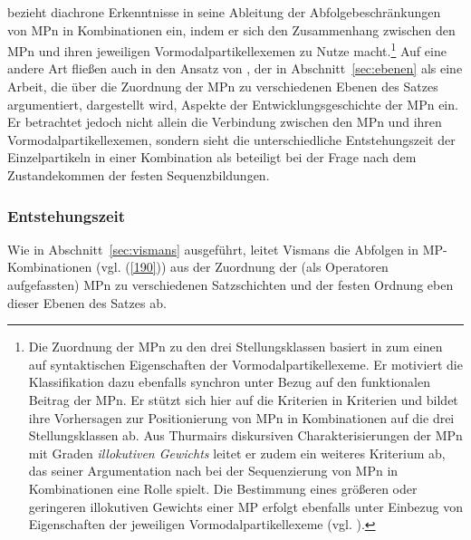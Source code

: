 \noindent
\citet{Abraham1995} bezieht diachrone  Erkenntnisse in seine Ableitung der Abfolgebeschränkungen von MPn in Kombinationen ein, indem er sich den Zusammenhang zwischen den MPn und ihren jeweiligen Vormodalpartikellexemen  zu Nutze macht.\footnote{Die Zuordnung der MPn zu den drei Stellungsklassen basiert in \citet{Abraham1995} zum einen auf syntaktischen Eigenschaften der Vormodalpartikellexeme. Er motiviert die Klassifikation dazu ebenfalls synchron unter Bezug auf den funktionalen Beitrag der MPn. Er stützt sich hier auf die Kriterien in \citet{Thurmair1989, Thurmair1991} Kriterien und bildet ihre Vorhersagen zur Positionierung von MPn in Kombinationen auf die drei Stellungsklassen ab. Aus Thurmairs diskursiven Charakterisierungen der MPn mit Graden \textit{illokutiven Gewichts} leitet er zudem ein weiteres Kriterium ab, das seiner Argumentation nach bei der Sequenzierung von MPn in Kombinationen eine Rolle spielt. Die Bestimmung eines größeren oder geringeren illokutiven Gewichts einer MP erfolgt ebenfalls unter Einbezug von Eigenschaften der jeweiligen Vormodalpartikellexeme  (vgl. \citealt[104]{Abraham1995}).} Auf eine andere Art fließen auch in den Ansatz von \citet{Vismans1994}, der in Abschnitt~\ref{sec:ebenen} als eine Arbeit, die über die Zuordnung der MPn zu verschiedenen Ebenen des Satzes argumentiert, dargestellt wird, Aspekte der Ent\-wicklungsgeschichte der MPn ein. Er betrachtet jedoch nicht allein die Verbin\-dung zwischen den MPn und ihren Vormodalpartikellexemen, sondern sieht die unterschiedliche Entstehungszeit der Einzelpartikeln in einer Kombination als beteiligt bei der Frage nach dem Zustandekommen der festen Sequenzbildungen.

\subsubsection{Entstehungszeit}
Wie in Abschnitt~\ref{sec:vismans} ausgeführt, leitet Vismans die Abfolgen in MP-Kombinatio\-nen (vgl. (\ref{190})) aus der Zuordnung der (als Operatoren  aufgefassten) MPn zu verschiedenen Satzschichten und der festen Ordnung eben dieser Ebenen des Satzes ab.

